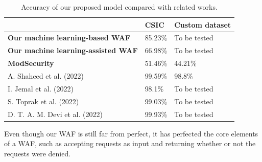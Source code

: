 \begin{table}[h!]
\centering
	\begin{tabular}{lll} 
	\hline
										  & \textbf{CSIC}       & \textbf{Custom dataset} \\ \hline
	\textbf{Our machine learning-based WAF} &85.23\% & To be tested \\
	\textbf{Our machine learning-assisted WAF} &66.98\% & To be tested \\
	\textbf{ModSecurity}                &51.46\% &44.21\% \\
	A. Shaheed et al.\cite{Shaheed} (2022)                    & 99.59\%    & 98.8\%         \\
	I. Jemal et al. \cite{Jemal} (2022)                       & 98.1\%     & To be tested     \\
	S. Toprak et al. \cite{Toprak} (2022)                     & 99.03\%    & To be tested     \\
	D. T. A. M. Devi et al. \cite{Devi} (2022)                             & 99.93\%    & To be tested \\ \hline
	\end{tabular}
	\caption{\label{demo-table} Accuracy of our proposed model compared with related works.
	}
\end{table} 

Even though our WAF is still far from perfect, it has perfected the core elements of a WAF, such as accepting requests as input and returning whether or not the requests were denied. 

